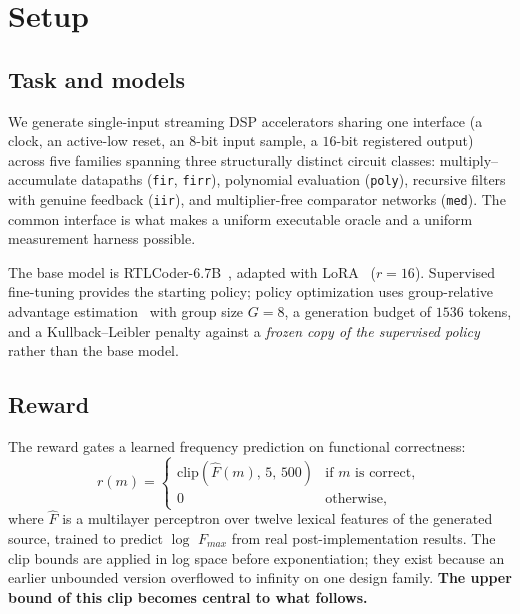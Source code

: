 \documentclass[journal]{IEEEtran}
\newcommand{\fmax}{$F_{\mathit{max}}$}
\begin{document}
\section{Setup}
\label{sec:setup}

\subsection{Task and models}

We generate single-input streaming DSP accelerators sharing one interface (a
clock, an active-low reset, an $8$-bit input sample, a $16$-bit registered
output) across five families spanning three structurally distinct circuit
classes: multiply--accumulate datapaths (\texttt{fir}, \texttt{firr}),
polynomial evaluation (\texttt{poly}), recursive filters with genuine feedback
(\texttt{iir}), and multiplier-free comparator networks (\texttt{med}). The
common interface is what makes a uniform executable oracle and a uniform
measurement harness possible.

The base model is RTLCoder-6.7B~\cite{liu2024rtlcoder}, adapted with
LoRA~\cite{hu2022lora} ($r=16$). Supervised fine-tuning provides the starting
policy; policy optimization uses group-relative advantage
estimation~\cite{shao2024deepseekmath} with group size $G=8$, a generation
budget of $1536$ tokens, and a Kullback--Leibler penalty against a
\emph{frozen copy of the supervised policy} rather than the base model.

\subsection{Reward}

The reward gates a learned frequency prediction on functional correctness:
\begin{equation}
r(m) =
\begin{cases}
\mathrm{clip}\!\left(\hat{F}(m),\, 5,\, 500\right) & \text{if } m \text{ is
correct},\\[2pt]
0 & \text{otherwise},
\end{cases}
\label{eq:reward}
\end{equation}
where $\hat{F}$ is a multilayer perceptron over twelve lexical features of the
generated source, trained to predict $\log$ \fmax{} from real
post-implementation results. The clip bounds are applied in log space before
exponentiation; they exist because an earlier unbounded version overflowed to
infinity on one design family. \textbf{The upper bound of this clip becomes
central to what follows.}
\end{document}
